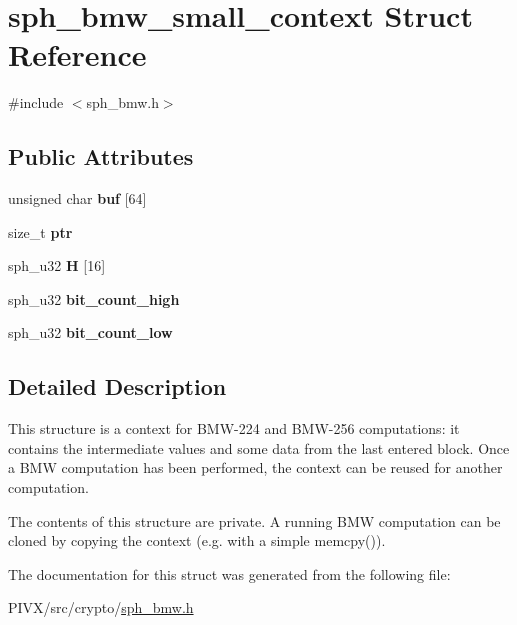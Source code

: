 \hypertarget{structsph__bmw__small__context}{}\section{sph\+\_\+bmw\+\_\+small\+\_\+context Struct Reference}
\label{structsph__bmw__small__context}


{\ttfamily \#include $<$sph\+\_\+bmw.\+h$>$}

\subsection*{Public Attributes}
\begin{DoxyCompactItemize}
\item 
\mbox{\label{structsph__bmw__small__context_a5f1580ed6522ddbb529017d3ba68e7b5}} 
unsigned char {\bfseries buf} \mbox{[}64\mbox{]}
\item 
\mbox{\label{structsph__bmw__small__context_ac3a10222d190e8421416d19330dc3629}} 
size\+\_\+t {\bfseries ptr}
\item 
\mbox{\label{structsph__bmw__small__context_a764567f1e5b6b3e8f9b14d87735ea4d8}} 
sph\+\_\+u32 {\bfseries H} \mbox{[}16\mbox{]}
\item 
\mbox{\label{structsph__bmw__small__context_a97ea70c252613bc1c1b41a862c8368ac}} 
sph\+\_\+u32 {\bfseries bit\+\_\+count\+\_\+high}
\item 
\mbox{\label{structsph__bmw__small__context_a1f4f38d96781dea1579d0e3320fa8968}} 
sph\+\_\+u32 {\bfseries bit\+\_\+count\+\_\+low}
\end{DoxyCompactItemize}


\subsection{Detailed Description}
This structure is a context for B\+M\+W-\/224 and B\+M\+W-\/256 computations\+: it contains the intermediate values and some data from the last entered block. Once a B\+MW computation has been performed, the context can be reused for another computation.

The contents of this structure are private. A running B\+MW computation can be cloned by copying the context (e.\+g. with a simple {\ttfamily memcpy()}). 

The documentation for this struct was generated from the following file\+:\begin{DoxyCompactItemize}
\item 
P\+I\+V\+X/src/crypto/\mbox{\hyperlink{sph__bmw_8h}{sph\+\_\+bmw.\+h}}\end{DoxyCompactItemize}
